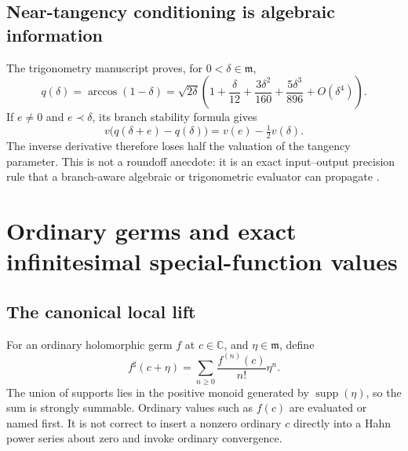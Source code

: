 \documentclass[11pt,letterpaper]{article}
\theoremstyle{definition}
\newcommand{\C}{\mathbb C}
\newcommand{\mm}{\mathfrak m}
\newcommand{\supp}{\operatorname{supp}}
\newcommand{\sh}{^{\sharp}}
\numberwithin{equation}{section}
\begin{document}
\subsection{Near-tangency conditioning is algebraic information}
The trigonometry manuscript proves, for $0<\delta\in\mm$,
\begin{equation}\label{eq:acos}
 q(\delta)=\arccos(1-\delta)
 =\sqrt{2\delta}\left(1+\frac\delta{12}
       +\frac{3\delta^2}{160}+\frac{5\delta^3}{896}+O(\delta^4)\right).
\end{equation}
If $e\ne0$ and $e\prec\delta$, its branch stability formula gives
\begin{equation}\label{eq:acosprecision}
 v\bigl(q(\delta+e)-q(\delta)\bigr)
       =v(e)-\tfrac12v(\delta).
\end{equation}
The inverse derivative therefore loses half the valuation of the tangency parameter. This is not a roundoff anecdote: it is an exact input--output precision rule that a branch-aware algebraic or trigonometric evaluator can propagate \cite[``Tangency, angular splitting, and loss of valuation'']{SourceTrig}.

\section{Ordinary germs and exact infinitesimal special-function values}\label{sec:germs}
\subsection{The canonical local lift}
For an ordinary holomorphic germ $f$ at $c\in\C$, and $\eta\in\mm$, define
\begin{equation}\label{eq:taylorlift}
 f\sh(c+\eta)=\sum_{n\ge0}\frac{f^{(n)}(c)}{n!}\eta^n.
\end{equation}
The union of supports lies in the positive monoid generated by $\supp(\eta)$, so the sum is strongly summable. Ordinary values such as $f(c)$ are evaluated or named first. It is not correct to insert a nonzero ordinary $c$ directly into a Hahn power series about zero and invoke ordinary convergence.
\end{document}
